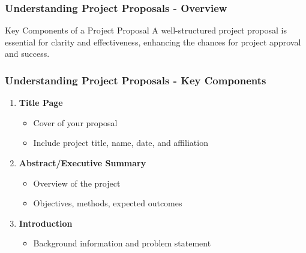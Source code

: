 \documentclass[aspectratio=169]{beamer}
\begin{document}
\begin{frame}[fragile]
  \frametitle{Understanding Project Proposals - Overview}
  \begin{block}{Key Components of a Project Proposal}
    A well-structured project proposal is essential for clarity and effectiveness, enhancing the chances for project approval and success.
  \end{block}
\end{frame}

\begin{frame}[fragile]
  \frametitle{Understanding Project Proposals - Key Components}
  \begin{enumerate}
    \item \textbf{Title Page} 
      \begin{itemize}
        \item Cover of your proposal
        \item Include project title, name, date, and affiliation
      \end{itemize}
      
    \item \textbf{Abstract/Executive Summary}
      \begin{itemize}
        \item Overview of the project
        \item Objectives, methods, expected outcomes
      \end{itemize}
      
    \item \textbf{Introduction}
      \begin{itemize}
        \item Background information and problem statement
      \end{itemize}
  \end{enumerate}
\end{frame}
\end{document}
